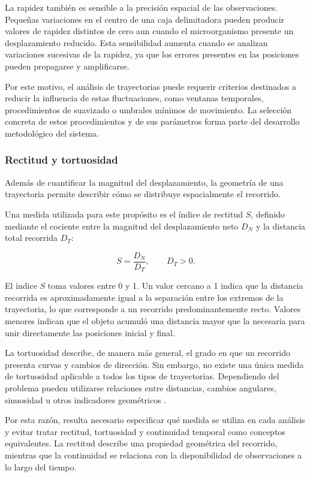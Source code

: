 La rapidez también es sensible a la precisión espacial de las observaciones. Pequeñas variaciones en el centro de una caja delimitadora pueden producir valores de rapidez distintos de cero aun cuando el microorganismo presente un desplazamiento reducido. Esta sensibilidad aumenta cuando se analizan variaciones sucesivas de la rapidez, ya que los errores presentes en las posiciones pueden propagarse y amplificarse.

Por este motivo, el análisis de trayectorias puede requerir criterios destinados a reducir la influencia de estas fluctuaciones, como ventanas temporales, procedimientos de suavizado o umbrales mínimos de movimiento. La selección concreta de estos procedimientos y de sus parámetros forma parte del desarrollo metodológico del sistema.

\subsubsection{Rectitud y tortuosidad}

Además de cuantificar la magnitud del desplazamiento, la geometría de una trayectoria permite describir cómo se distribuye espacialmente el recorrido.

Una medida utilizada para este propósito es el índice de rectitud $S$, definido mediante el cociente entre la magnitud del desplazamiento neto $D_N$ y la distancia total recorrida $D_T$:

\[
S=\frac{D_N}{D_T}, \qquad D_T>0.
\]

El índice $S$ toma valores entre 0 y 1. Un valor cercano a 1 indica que la distancia recorrida es aproximadamente igual a la separación entre los extremos de la trayectoria, lo que corresponde a un recorrido predominantemente recto. Valores menores indican que el objeto acumuló una distancia mayor que la necesaria para unir directamente las posiciones inicial y final.

La tortuosidad describe, de manera más general, el grado en que un recorrido presenta curvas y cambios de dirección. Sin embargo, no existe una única medida de tortuosidad aplicable a todos los tipos de trayectorias. Dependiendo del problema pueden utilizarse relaciones entre distancias, cambios angulares, sinuosidad u otros indicadores geométricos \cite{benhamou2004}.

Por esta razón, resulta necesario especificar qué medida se utiliza en cada análisis y evitar tratar rectitud, tortuosidad y continuidad temporal como conceptos equivalentes. La rectitud describe una propiedad geométrica del recorrido, mientras que la continuidad se relaciona con la disponibilidad de observaciones a lo largo del tiempo.

